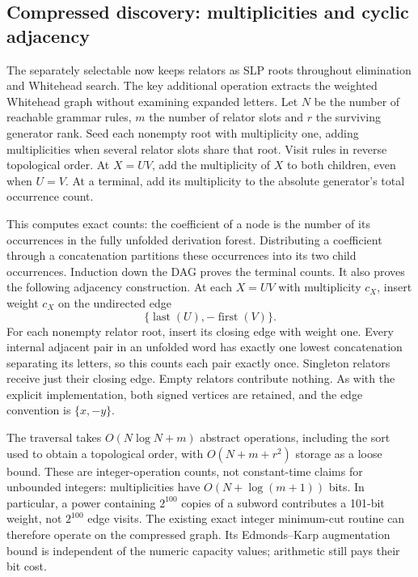 \subsection{Compressed discovery: multiplicities and cyclic adjacency}
\label{sec:compressed-search}

The separately selectable  now keeps relators
as SLP roots throughout elimination and Whitehead search.  The key
additional operation extracts the weighted Whitehead graph without
examining expanded letters.  Let $N$ be the number of reachable grammar
rules, $m$ the number of relator slots and $r$ the surviving generator
rank.  Seed each nonempty root with multiplicity one, adding multiplicities
when several relator slots share that root.  Visit rules in reverse
topological order.  At $X=UV$, add the multiplicity of $X$ to both children,
even when $U=V$.  At a terminal, add its multiplicity to the absolute
generator's total occurrence count.

This computes exact counts: the coefficient of a node is the number of its
occurrences in the fully unfolded derivation forest.  Distributing a
coefficient through a concatenation partitions these occurrences into its
two child occurrences.  Induction down the DAG proves the terminal counts.
It also proves the following adjacency construction.  At each $X=UV$ with
multiplicity $c_X$, insert weight $c_X$ on the undirected edge
\[
 \{\operatorname{last}(U),-\operatorname{first}(V)\}.
\]
For each nonempty relator root, insert its closing edge with weight one.
Every internal adjacent pair in an unfolded word has exactly one lowest
concatenation separating its letters, so this counts each pair exactly once.
Singleton relators receive just their closing edge. Empty relators contribute
nothing. As with the explicit implementation, both signed vertices are
retained, and the edge convention is $\{x,-y\}$.

The traversal takes $O(N\log N+m)$ abstract operations, including the sort
used to obtain a topological order, with $O(N+m+r^2)$ storage as a loose
bound. These are integer-operation counts, not constant-time claims for
unbounded integers: multiplicities have $O(N+\log(m+1))$ bits. In
particular, a power containing $2^{100}$ copies of a subword contributes
a 101-bit weight, not $2^{100}$ edge visits. The existing exact integer
minimum-cut routine can therefore operate on the compressed graph. Its
Edmonds--Karp augmentation bound is independent of the numeric capacity
values; arithmetic still pays their bit cost.

